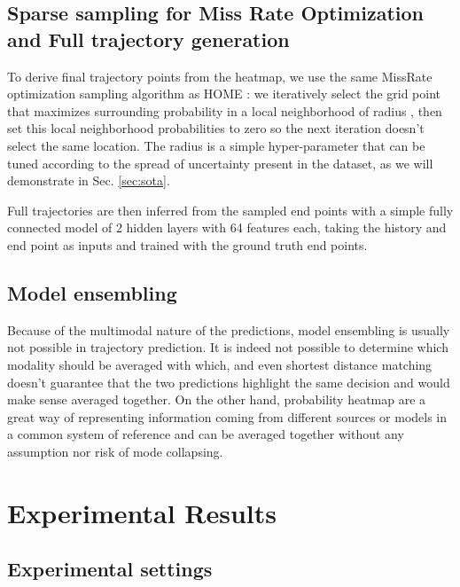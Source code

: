 \documentclass[letterpaper, 10 pt, conference]{ieeeconf}
\begin{document}
\subsection{Sparse sampling for Miss Rate Optimization and Full trajectory generation}

To derive final trajectory points from the heatmap, we use the same MissRate optimization sampling algorithm as HOME \cite{gilles2021home}: we iteratively select the grid point that maximizes surrounding probability in a local neighborhood of radius , then set this local neighborhood probabilities to zero so the next iteration doesn't select the same location. The radius  is a simple hyper-parameter that can be tuned according to the spread of uncertainty present in the dataset, as we will demonstrate in Sec. \ref{sec:sota}.

Full trajectories are then inferred from the sampled end points with a simple fully connected model of 2 hidden layers with 64 features each, taking the history and end point as inputs and trained with the ground truth end points.



\subsection{Model ensembling}

Because of the multimodal nature of the predictions, model ensembling is usually not possible in trajectory prediction. It is indeed not possible to determine which modality should be averaged with which, and even shortest distance matching doesn't guarantee that the two predictions highlight the same decision and would make sense averaged together. On the other hand, probability heatmap are a great way of representing information coming from different sources or models in a common system of reference and can be averaged together without any assumption nor risk of mode collapsing. 






\section{Experimental Results}
\label{sec:result}

\subsection{Experimental settings}
\end{document}
